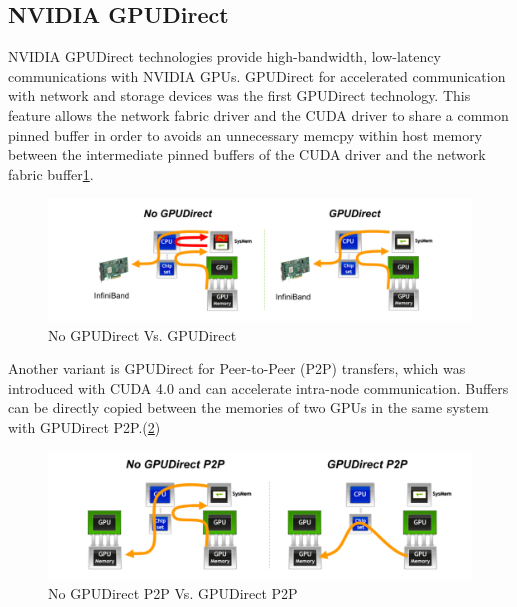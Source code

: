 \documentclass[article]{scrartcl}
\begin{document}
\subsection{NVIDIA GPUDirect}
NVIDIA GPUDirect technologies provide high-bandwidth, low-latency communications with NVIDIA GPUs. 
GPUDirect for accelerated communication with network and storage devices was the first GPUDirect technology. This feature allows the network fabric driver and the CUDA driver to share a common pinned buffer in order to avoids an unnecessary memcpy within host memory between the intermediate pinned buffers of the CUDA driver and the network fabric buffer\ref{fig:GPUDirect}.
\begin{figure}[htpb]
	\centering
	\includegraphics[width=\textwidth,keepaspectratio=true]{../figs/GPUDIrect.png}
	\caption{No GPUDirect Vs. GPUDirect\cite{introCudaAware}}
	\label{fig:GPUDirect}
\end{figure}


Another variant is GPUDirect for Peer-to-Peer (P2P) transfers, which was introduced with CUDA 4.0 and can accelerate intra-node communication. Buffers can be directly copied between the memories of two GPUs in the same system with GPUDirect P2P.(\ref{fig:GPUDirectP2P})
\begin{figure}[htpb]
	\centering
	\includegraphics[width=\textwidth,keepaspectratio=true]{../figs/GPUDIrectP2P.png}
	\caption{No GPUDirect P2P Vs. GPUDirect P2P\cite{introCudaAware}}
	\label{fig:GPUDirectP2P}
\end{figure}
\end{document}
